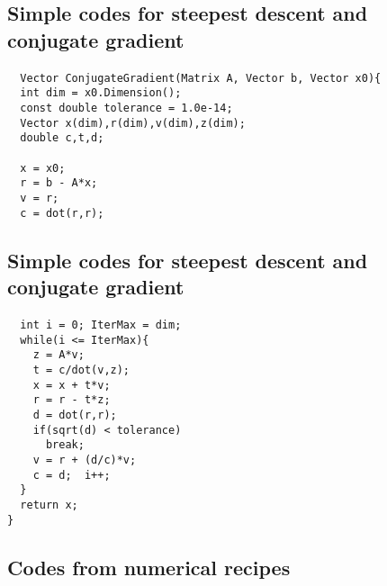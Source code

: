 \documentclass[%
twoside,                 %
final,                   %
10pt]{article}
\begin{document}
\subsection*{Simple codes for  steepest descent and conjugate gradient}

\paragraph{}
\begin{verbatim}
  Vector ConjugateGradient(Matrix A, Vector b, Vector x0){
  int dim = x0.Dimension();
  const double tolerance = 1.0e-14;
  Vector x(dim),r(dim),v(dim),z(dim);
  double c,t,d;

  x = x0;
  r = b - A*x;
  v = r;
  c = dot(r,r);
\end{verbatim}




\subsection*{Simple codes for  steepest descent and conjugate gradient}

\paragraph{}
\begin{verbatim}
  int i = 0; IterMax = dim;
  while(i <= IterMax){
    z = A*v;
    t = c/dot(v,z);
    x = x + t*v;
    r = r - t*z;
    d = dot(r,r);
    if(sqrt(d) < tolerance)
      break;
    v = r + (d/c)*v;
    c = d;  i++;
  }
  return x;
} 
\end{verbatim}




\subsection*{Codes from numerical recipes}

\end{document}
